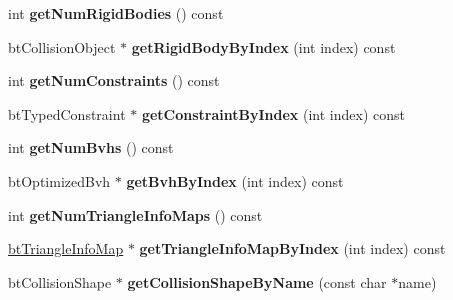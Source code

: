 \begin{DoxyCompactItemize}
\item 
\hypertarget{classbt_world_importer_a495204935a9a07ed20f7e955ca1fc13e}{int {\bfseries get\+Num\+Rigid\+Bodies} () const }\label{classbt_world_importer_a495204935a9a07ed20f7e955ca1fc13e}

\item 
\hypertarget{classbt_world_importer_a2568e8eeacb3298c9a5edeb29416ec73}{bt\+Collision\+Object $\ast$ {\bfseries get\+Rigid\+Body\+By\+Index} (int index) const }\label{classbt_world_importer_a2568e8eeacb3298c9a5edeb29416ec73}

\item 
\hypertarget{classbt_world_importer_a97fd549367c3b7c83ede1300a32a7e89}{int {\bfseries get\+Num\+Constraints} () const }\label{classbt_world_importer_a97fd549367c3b7c83ede1300a32a7e89}

\item 
\hypertarget{classbt_world_importer_adb7f39089e82abfdaea514526d91cfb3}{bt\+Typed\+Constraint $\ast$ {\bfseries get\+Constraint\+By\+Index} (int index) const }\label{classbt_world_importer_adb7f39089e82abfdaea514526d91cfb3}

\item 
\hypertarget{classbt_world_importer_a742ec2f68fcdeeb479f2303740463c9c}{int {\bfseries get\+Num\+Bvhs} () const }\label{classbt_world_importer_a742ec2f68fcdeeb479f2303740463c9c}

\item 
\hypertarget{classbt_world_importer_abb267efe37211ba6c0324b36c4e16de5}{bt\+Optimized\+Bvh $\ast$ {\bfseries get\+Bvh\+By\+Index} (int index) const }\label{classbt_world_importer_abb267efe37211ba6c0324b36c4e16de5}

\item 
\hypertarget{classbt_world_importer_a88b77b46c7f0eafc34216e019adbe27f}{int {\bfseries get\+Num\+Triangle\+Info\+Maps} () const }\label{classbt_world_importer_a88b77b46c7f0eafc34216e019adbe27f}

\item 
\hypertarget{classbt_world_importer_aa825dd0cda4e1225bca6cb79c6704b18}{\hyperlink{structbt_triangle_info_map}{bt\+Triangle\+Info\+Map} $\ast$ {\bfseries get\+Triangle\+Info\+Map\+By\+Index} (int index) const }\label{classbt_world_importer_aa825dd0cda4e1225bca6cb79c6704b18}

\item 
\hypertarget{classbt_world_importer_ac38441ce4ec83187deb87b5f8781c4e3}{bt\+Collision\+Shape $\ast$ {\bfseries get\+Collision\+Shape\+By\+Name} (const char $\ast$name)}\label{classbt_world_importer_ac38441ce4ec83187deb87b5f8781c4e3}


\end{DoxyCompactItemize}
